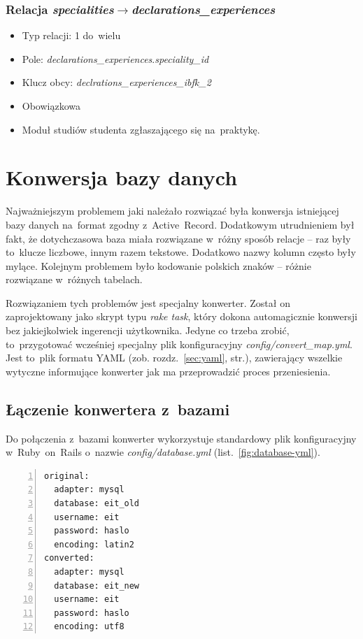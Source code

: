 \documentclass[a4paper,12pt,oneside]{report}
\begin{document}
\subsubsection{Relacja \emph{specialities}$\to$\emph{declarations\_experiences}}
\label{subsub:specialities-declarations_experiences}
\begin{itemize}
  \item Typ relacji: 1 do~wielu
  \item Pole: \emph{declarations\_experiences}.\emph{speciality\_id}
  \item Klucz obcy: \emph{declrations\_experiences\_ibfk\_2}
  \item Obowiązkowa
  \item Moduł studiów studenta zgłaszającego się na~praktykę.
\end{itemize}

\section{Konwersja bazy danych}
\label{sec:db-konwersja}
Najważniejszym problemem jaki należało rozwiązać była konwersja istniejącej bazy danych na~format zgodny z~Active~Record. Dodatkowym utrudnieniem był fakt, że dotychczasowa baza miała rozwiązane w~różny sposób relacje -- raz były to~klucze liczbowe, innym razem tekstowe. Dodatkowo nazwy kolumn często były mylące. Kolejnym problemem było kodowanie polskich znaków -- różnie rozwiązane w~różnych tabelach.

Rozwiązaniem tych problemów jest specjalny konwerter. Został on zaprojektowany jako skrypt typu \emph{rake task}, który dokona automagicznie konwersji bez jakiejkolwiek ingerencji użytkownika. Jedyne co trzeba zrobić, to~przygotować wcześniej specjalny plik konfiguracyjny \emph{config/convert\_map.yml}. Jest to~plik formatu YAML (zob. rozdz.~\ref{sec:yaml}, str.\pageref{sec:yaml}), zawierający wszelkie wytyczne informujące konwerter jak ma przeprowadzić proces przeniesienia.

\subsection{Łączenie konwertera z~bazami}
\label{sub:convert-base}
Do połączenia z~bazami konwerter wykorzystuje standardowy plik konfiguracyjny w~Ruby~on~Rails o~nazwie \emph{config/database.yml} (list.~\ref{fig:database-yml}). 

\begin{lstlisting}[caption={Przykładowe wpisy konwertera w~pliku \emph{config/database.yml}},label=fig:database-yml,captionpos=b,numbers=left]
original:
  adapter: mysql
  database: eit_old
  username: eit
  password: haslo
  encoding: latin2
converted:
  adapter: mysql
  database: eit_new
  username: eit
  password: haslo
  encoding: utf8
\end{lstlisting}
\end{document}
